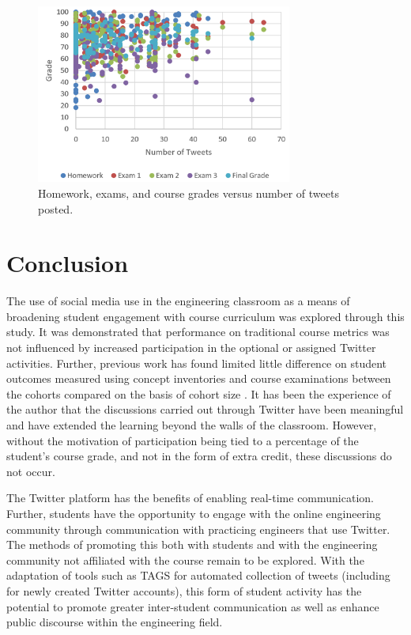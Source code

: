 \documentclass[12pt]{article}
\begin{document}
\begin{figure}[hbtp]
\centering
\includegraphics[width=0.75\textwidth]{figures/numTweets.png}
\caption{Homework, exams, and course grades versus number of tweets posted.}
\label{fig:numTweets}
\end{figure}



\section*{Conclusion}
The use of social media use in the engineering classroom as a means of broadening student engagement with course curriculum was explored through this study. It was demonstrated that performance on traditional course metrics was not influenced by increased participation in the optional or assigned Twitter activities. Further, previous work has found limited little difference on student outcomes measured using concept inventories and course examinations between the cohorts compared on the basis of cohort size \cite{berg_relationship_2015}. It has been the experience of the author that the discussions carried out through Twitter have been meaningful and have extended the learning beyond the walls of the classroom. However, without the motivation of participation being tied to a percentage of the student's course grade, and not in the form of extra credit, these discussions do not occur. 

The Twitter platform has the benefits of enabling real-time communication. Further, students have the opportunity to engage with the online engineering community through communication with practicing engineers that use Twitter. The methods of promoting this both with students and with the engineering community not affiliated with the course remain to be explored.  With the adaptation of tools such as TAGS for automated collection of tweets (including for newly created Twitter accounts), this form of student activity has the potential to promote greater inter-student communication as well as enhance public discourse within the engineering field.
\end{document}
